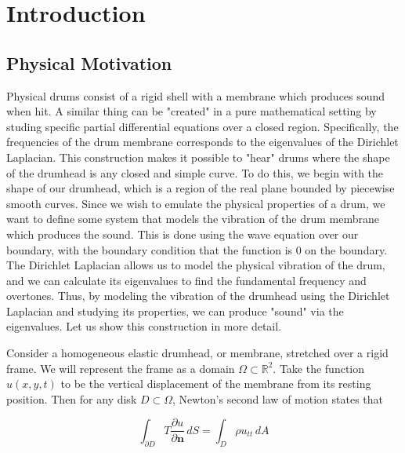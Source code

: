 \documentclass[12pt]{report}
\numberwithin{definition}{section}
\begin{document}
	
\break

\tableofcontents


\newcommand{\comment}[1]{}


\break


\pagestyle{myheadings}



\chapter{Introduction}

\break
\section {Physical Motivation}


Physical drums consist of a rigid shell with a membrane which produces sound when hit.
A similar thing can be "created" in a pure mathematical setting by studing specific partial differential equations over a closed region.
Specifically, the frequencies of the drum membrane corresponds to the eigenvalues of the Dirichlet Laplacian.
This construction makes it possible to "hear" drums where the shape of the drumhead is any closed and simple curve.
To do this, we begin with the shape of our drumhead, which is a region of the real plane bounded by piecewise smooth curves.
Since we wish to emulate the physical properties of a drum, we want to define some system that models the vibration of the drum membrane which produces the sound.
This is done using the wave equation over our boundary, with the boundary condition that the function is 0 on the boundary.
The Dirichlet Laplacian allows us to model the physical vibration of the drum, and we can calculate its eigenvalues to find the fundamental frequency and overtones.
Thus, by modeling the vibration of the drumhead using the Dirichlet Laplacian and studying its properties, we can produce "sound" via the eigenvalues.
Let us show this construction in more detail.


Consider a homogeneous elastic drumhead, or membrane, stretched over a rigid frame.
We will represent the frame as a domain $\Omega \subset \mathbb{R}^{2}$.
Take the function $u(x,y,t)$ to be the vertical displacement of the membrane from its resting position.
Then for any disk $D \subset \Omega$, Newton's second law of motion states that

$$ \int_{\partial D} T \frac{\partial u}{\partial \textbf{n}} \, dS = \int_{ D} \rho u_{tt} \, dA $$
\end{document}

